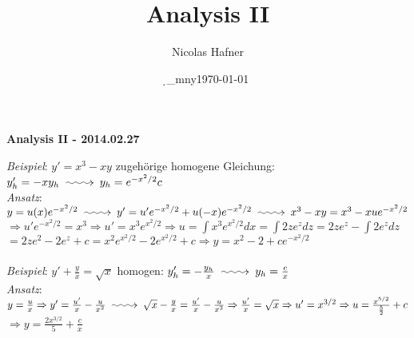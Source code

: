 \documentclass[12pt,a4paper,titlepage]{article}
\author{Nicolas Hafner}
\title{Analysis II}
\date{\d_mny\today}
\makeatletter
\newcommand{\longsquiggly}{\xymatrix{{}\ar@{~>}[r]&{}}}
\makeatother
\begin{document}
	
\begin{center}{\bfseries\Huge Analysis II - 2014.02.27}\end{center}
\textit{Beispiel}: $y'=x^3-xy$ zugehörige homogene Gleichung: $y_h'=-xy_h \longsquiggly y_h=e^{-x^2/2}c$ \\
\textit{Ansatz}: $y=u(x)e^{-x^2/2} \longsquiggly y'=u'e^{-x^2/2}+u(-x)e^{-x^2/2} \longsquiggly x^3-xy=x^3-xue^{-x^2/2}$ \\
$\Rightarrow u'e^{-x^2/2}=x^3 \Rightarrow u'=x^3e^{x^2/2} \Rightarrow u=\int x^3e^{x^2/2}dx=\int 2ze^zdz=2ze^z-\int2e^zdz $ \\
$=2ze^2-2e^z+c=x^2e^{x^2/2}-2e^{x^2/2}+c \Rightarrow y=x^2-2+ce^{-x^2/2}$ \\
\\
\textit{Beispiel}: $y'+\frac{y}{x}=\sqrt{x}$ homogen: $y_h'=-\frac{y_h}{x} \longsquiggly y_h=\frac{c}{x}$ \\
\textit{Ansatz}: $y=\frac{u}{x} \Rightarrow y'=\frac{u'}{x}-\frac{u}{x^2} \longsquiggly \sqrt{x}-\frac{y}{x}=\frac{u'}{x}-\frac{u}{x^2} \Rightarrow \frac{u'}{x}=\sqrt{x} \Rightarrow u'=x^{3/2} \Rightarrow u=\frac{x^{5/2}}{\frac{5}{2}}+c$ \\
$\Rightarrow y=\frac{2x^{3/2}}{5}+\frac{c}{x}$
\end{document}
